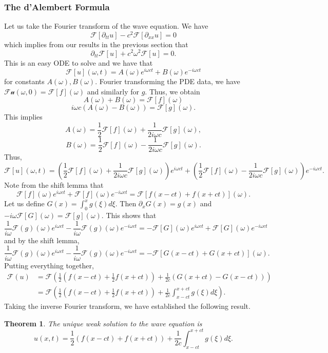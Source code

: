 \documentclass{article}
\newtheorem{theorem}{Theorem}[subsection] %
\theoremstyle{definition}
\theoremstyle{definition}
\begin{document}
\subsubsection{The d'Alembert Formula}
Let us take the Fourier transform of the wave equation. We have
$$\mathcal{F}[\partial_{tt}u]-c^2\mathcal{F}[\partial_{xx}u]=0$$
which implies from our results in the previous section that
$$\partial_{tt}\mathcal{F}[u]+c^2\omega^2\mathcal{F}[u]=0.$$
This is an easy ODE to solve and we have that
$$\mathcal{F}[u](\omega,t)=A(\omega)e^{i\omega ct}+B(\omega)e^{-i\omega ct}$$
for constants $A(\omega),B(\omega)$. Fourier transforming the PDE data, we have $\mathcal{Fu}(\omega,0)=\mathcal{F}[f](\omega)$ and similarly for $g$. Thus, we obtain
$$A(\omega)+B(\omega)=\mathcal{F}[f](\omega)$$
$$i\omega c(A(\omega)-B(\omega))=\mathcal{F}[g](\omega).$$
This implies
$$A(\omega)=\frac{1}{2}\mathcal{F}[f](\omega)+\frac{1}{2i\omega c}\mathcal{F}[g](\omega),$$
$$B(\omega)=\frac{1}{2}\mathcal{F}[f](\omega)-\frac{1}{2i\omega c}\mathcal{F}[g](\omega).$$
Thus,
$$\mathcal{F}[u](\omega,t)=\left(\frac{1}{2}\mathcal{F}[f](\omega)+\frac{1}{2i\omega c}\mathcal{F}[g](\omega)\right)e^{i\omega ct}+\left(\frac{1}{2}\mathcal{F}[f](\omega)-\frac{1}{2i\omega c}\mathcal{F}[g](\omega)\right)e^{-i\omega ct}.$$
Note from the shift lemma that
$$\mathcal{F}[f](\omega)e^{i\omega ct}+\mathcal{F}[f](\omega)e^{-i\omega ct}=\mathcal{F}[f(x-ct)+f(x+ct)](\omega).$$
Let us define $G(x)=\int_{0}^{x}g(\xi)d\xi$. Then $\partial_{x}G(x)=g(x)$ and $-i\omega\mathcal{F}[G](\omega)=\mathcal{F}[g](\omega)$. This shows that
$$\frac{1}{i\omega}\mathcal{F}(g)(\omega)e^{i\omega ct}-\frac{1}{i\omega}\mathcal{F}(g)(\omega)e^{-i\omega ct}=-\mathcal{F}[G](\omega)e^{i\omega ct}+\mathcal{F}[G](\omega)e^{-i\omega ct}$$
and by the shift lemma,
$$\frac{1}{i\omega}\mathcal{F}(g)(\omega)e^{i\omega ct}-\frac{1}{i\omega}\mathcal{F}(g)(\omega)e^{-i\omega ct}=-\mathcal{F}[G(x-ct)+G(x+ct)](\omega).$$
Putting everything together,
\begin{align*}
    \mathcal{F}(u)&=\mathcal{F}\left(\frac{1}{2}(f(x-ct)+\frac{1}{2}f(x+ct))+\frac{1}{2c}(G(x+ct)-G(x-ct))\right) \\
    &=\mathcal{F}\left(\frac{1}{2}(f(x-ct)+\frac{1}{2}f(x+ct))+\frac{1}{2c}\int_{x-ct}^{x+ct}g(\xi)d\xi\right).
\end{align*}
Taking the inverse Fourier transform, we have established the following result.
\begin{theorem}
    The unique weak solution to the wave equation is
    $$u(x,t)=\frac{1}{2}(f(x-ct)+f(x+ct))+\frac{1}{2c}\int_{x-ct}^{x+ct}g(\xi)d\xi.$$
\end{theorem}
\end{document}
